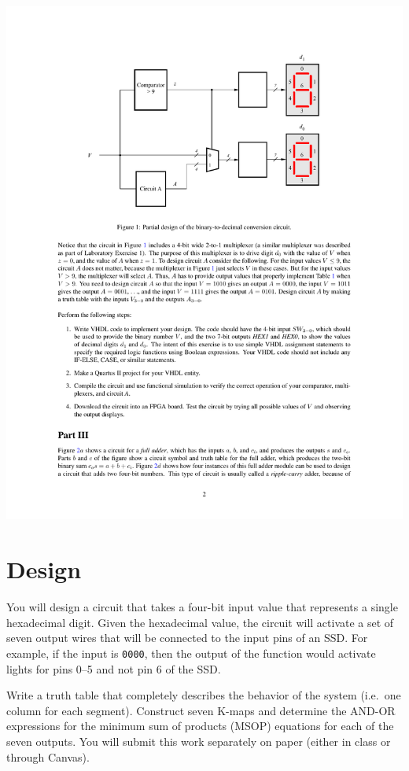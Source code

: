 \documentclass[10pt]{article}
\begin{document}
\begin{center}
\includegraphics[scale=1.0]{sssd}
\end{center}

\section{Design}

You will design a circuit that takes a four-bit input value that
represents a single hexadecimal digit. Given the hexadecimal value,
the circuit will activate a set of seven output wires that will be
connected to the input pins of an SSD. For example, if the input is
{\tt 0000}, then the output of the function would activate lights
for pins 0--5 and not pin 6 of the SSD.

Write a truth table that completely describes the behavior of the
system (i.e.\ one column for each segment). Construct seven K-maps and
determine the AND-OR expressions for the minimum sum of products
(MSOP) equations for each of the seven outputs. You will submit this
work separately on paper (either in class or through Canvas).
\end{document}
